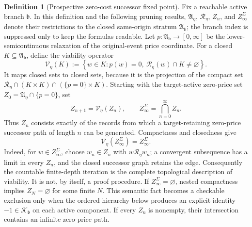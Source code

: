\documentclass[11pt]{article}
\numberwithin{section}{part}
\theoremstyle{plain}
\theoremstyle{definition}
\newtheorem{definition}[definition]{Definition}
\theoremstyle{remark}
\begin{document}
\begin{definition}[Prospective zero-cost successor fixed point]
\label{def:total-successor-saturation-algebra}
Fix a reachable active branch \(\mathfrak b\).  In this definition and the
following pruning results, \(\mathfrak A_\eta\), \(\mathcal R_\eta\),
\(Z_n\), and \(Z_\infty^\Sigma\) denote their restrictions to the closed
same-origin stratum \(\mathfrak A_{\mathfrak b}\); the branch index is
suppressed only to keep the formulas readable.  Let
\(p:\mathfrak A_{\mathfrak b}\to[0,\infty]\) be the lower-semicontinuous relaxation
of the original-event price coordinate.  For a closed
\(K\subseteq\mathfrak A_{\mathfrak b}\), define the viability operator
\begin{equation}
 \label{eq:zero-cost-viability-operator}
 \mathcal V_\eta(K)
 :=\left\{w\in K:p(w)=0,
       \ \mathcal R_\eta(w)\cap K\ne\varnothing\right\}.
\end{equation}
It maps closed sets to closed sets, because it is the projection of the compact
set \(\mathcal R_\eta\cap(K\times K)\cap(\{p=0\}\times K)\).
Starting with the target-active zero-price set
\(Z_0=\mathfrak A_\eta\cap\{p=0\}\), set
\begin{equation}
 \label{eq:finite-depth-zero-cost-closure}
 Z_{n+1}=\mathcal V_\eta(Z_n),
 \qquad
 Z_\infty^\Sigma=\bigcap_{n=0}^{\infty}Z_n.
\end{equation}
Thus \(Z_n\) consists exactly of the records from which a target-retaining
zero-price successor path of length \(n\) can be generated.  Compactness and
closedness give
\begin{equation}
 \label{eq:omega-viability-fixed-point}
 \mathcal V_\eta(Z_\infty^\Sigma)=Z_\infty^\Sigma.
\end{equation}
Indeed, for \(w\in Z_\infty^\Sigma\), choose
\(w_n\in Z_n\) with \(w\mathcal R_\eta w_n\); a convergent subsequence has a
limit in every \(Z_n\), and the closed successor graph retains the edge.
Consequently the countable finite-depth iteration is the complete topological
description of viability.  It is not, by itself, a proof procedure.
If \(Z_\infty^\Sigma=\varnothing\), nested compactness implies
\(Z_N=\varnothing\) for some finite \(N\).  This semantic fact becomes a
checkable exclusion only when the ordered hierarchy below produces an
explicit identity \(-1\in\mathcal K_{\mathfrak b}\) on each active component.  If
every \(Z_n\) is nonempty, their intersection contains an infinite zero-price
path.


\end{definition}
\end{document}
